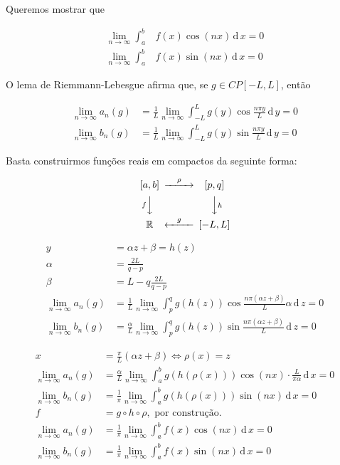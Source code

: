 \documentclass[12pt,a4paper]{article}
\begin{document}
		Queremos mostrar que

		\begin{align}
			\lim_{n \rightarrow \infty} \int_a^b &f(x) \cos(nx)\, \mathrm{d}\,x = 0 \\
			\lim_{n \rightarrow \infty} \int_a^b &f(x) \sin(nx)\, \mathrm{d}\,x = 0
		\end{align}

		O lema de Riemmann-Lebesgue afirma que, se $g \in CP[-L,L]$, ent\~ao

		\begin{align}
			\lim_{n \rightarrow \infty} a_n(g) &= \frac{1}{L} \lim_{n \rightarrow \infty} \int_{-L}^L g(y) \cos \frac{n\pi y}{L}\, \mathrm{d}\,y = 0 \\
			\lim_{n \rightarrow \infty} b_n(g) &= \frac{1}{L} \lim_{n \rightarrow \infty} \int_{-L}^L g(y) \sin \frac{n\pi y}{L}\, \mathrm{d}\,y = 0
		\end{align}

		Basta construirmos fun\c{c}\~oes reais em compactos da seguinte forma:

		\begin{align}
		 \begin{CD}
		  [a,b] @>\rho>> [p,q] \\
		  @V{f}VV  @VV{h}V \\
		  \mathbb{R} @<g<< [-L,L] \\
		 \end{CD}
		\end{align}

		\begin{align}
			y &= \alpha z + \beta = h(z) \\
			\alpha &= \frac{2L}{q - p} \\
			\beta &= L - q \frac{2L}{q - p} \\
			\lim_{n \rightarrow \infty} a_n(g) &= \frac{1}{L} \lim_{n \rightarrow \infty} \int_{p}^q g(h(z)) \cos \frac{n\pi (\alpha z + \beta)}{L} \alpha \, \mathrm{d}\,z = 0 \\
			\lim_{n \rightarrow \infty} b_n(g) &= \frac{\alpha}{L} \lim_{n \rightarrow \infty} \int_{p}^q g(h(z)) \sin \frac{n\pi (\alpha z + \beta)}{L} \, \mathrm{d}\,z = 0
		\end{align}

		\begin{align}
			x &= \frac{\pi}{L} (\alpha z + \beta) \Leftrightarrow \rho(x) = z \\
			\lim_{n \rightarrow \infty} a_n(g) &= \frac{\alpha}{L} \lim_{n \rightarrow \infty} \int_{a}^b g(h(\rho(x))) \cos (nx) \cdot \frac{L}{\pi\alpha} \, \mathrm{d}\,x = 0 \\
			\lim_{n \rightarrow \infty} b_n(g) &= \frac{1}{\pi} \lim_{n \rightarrow \infty} \int_{a}^b g(h(\rho(x))) \sin (nx) \, \mathrm{d}\,x = 0 \\
			f &= g \circ h \circ \rho, \text{ por constru\c{c}\~ao.} \\
			\lim_{n \rightarrow \infty} a_n(g) &= \frac{1}{\pi} \lim_{n \rightarrow \infty} \int_{a}^b f(x) \cos (nx) \, \mathrm{d}\,x = 0 \\
			\lim_{n \rightarrow \infty} b_n(g) &= \frac{1}{\pi} \lim_{n \rightarrow \infty} \int_{a}^b f(x) \sin (nx) \, \mathrm{d}\,x = 0
		\end{align}
\end{document}
